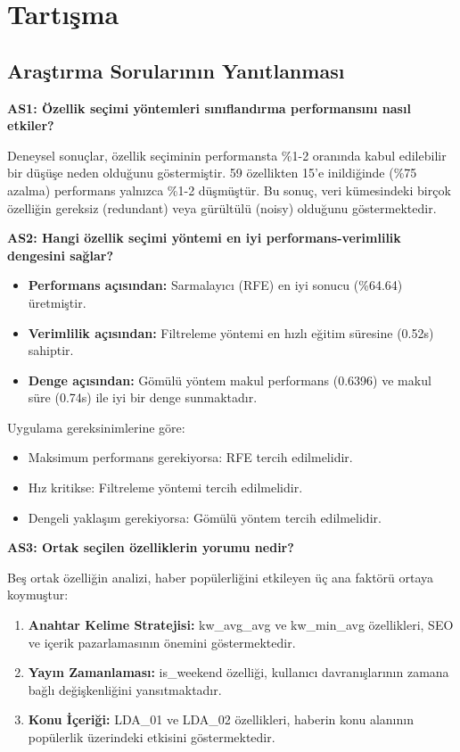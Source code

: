 \documentclass[conference]{IEEEtran}
\begin{document}
\section{Tartışma}

\subsection{Araştırma Sorularının Yanıtlanması}

\textbf{AS1: Özellik seçimi yöntemleri sınıflandırma performansını nasıl etkiler?}

Deneysel sonuçlar, özellik seçiminin performansta \%1-2 oranında kabul edilebilir bir düşüşe neden olduğunu göstermiştir. 59 özellikten 15'e inildiğinde (\%75 azalma) performans yalnızca \%1-2 düşmüştür. Bu sonuç, veri kümesindeki birçok özelliğin gereksiz (redundant) veya gürültülü (noisy) olduğunu göstermektedir.

\textbf{AS2: Hangi özellik seçimi yöntemi en iyi performans-verimlilik dengesini sağlar?}

\begin{itemize}
    \item \textbf{Performans açısından:} Sarmalayıcı (RFE) en iyi sonucu (\%64.64) üretmiştir.
    \item \textbf{Verimlilik açısından:} Filtreleme yöntemi en hızlı eğitim süresine (0.52s) sahiptir.
    \item \textbf{Denge açısından:} Gömülü yöntem makul performans (0.6396) ve makul süre (0.74s) ile iyi bir denge sunmaktadır.
\end{itemize}

Uygulama gereksinimlerine göre:
\begin{itemize}
    \item Maksimum performans gerekiyorsa: RFE tercih edilmelidir.
    \item Hız kritikse: Filtreleme yöntemi tercih edilmelidir.
    \item Dengeli yaklaşım gerekiyorsa: Gömülü yöntem tercih edilmelidir.
\end{itemize}

\textbf{AS3: Ortak seçilen özelliklerin yorumu nedir?}

Beş ortak özelliğin analizi, haber popülerliğini etkileyen üç ana faktörü ortaya koymuştur:

\begin{enumerate}
    \item \textbf{Anahtar Kelime Stratejisi:} kw\_avg\_avg ve kw\_min\_avg özellikleri, SEO ve içerik pazarlamasının önemini göstermektedir.
    
    \item \textbf{Yayın Zamanlaması:} is\_weekend özelliği, kullanıcı davranışlarının zamana bağlı değişkenliğini yansıtmaktadır.
    
    \item \textbf{Konu İçeriği:} LDA\_01 ve LDA\_02 özellikleri, haberin konu alanının popülerlik üzerindeki etkisini göstermektedir.
\end{enumerate}
\end{document}
